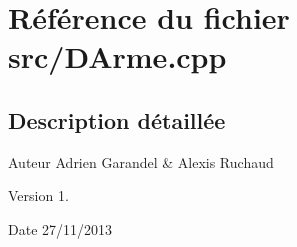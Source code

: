 \section{Référence du fichier src/\-D\-Arme.cpp}
\label{_d_arme_8cpp}


\subsection{Description détaillée}
\begin{DoxyAuthor}{Auteur}
Adrien Garandel \& Alexis Ruchaud 
\end{DoxyAuthor}
\begin{DoxyVersion}{Version}
1. 
\end{DoxyVersion}
\begin{DoxyDate}{Date}
27/11/2013 
\end{DoxyDate}
